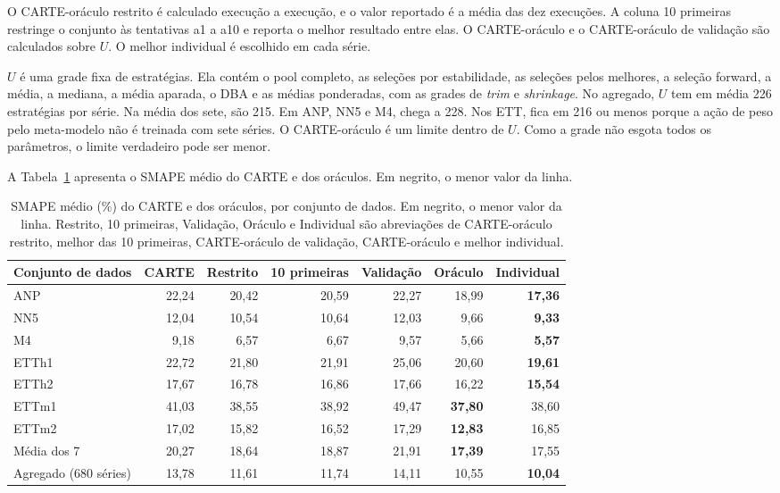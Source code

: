 O CARTE-oráculo restrito é calculado execução a execução, e o valor reportado é a média das dez execuções. A coluna 10 primeiras restringe o conjunto às tentativas a1 a a10 e reporta o melhor resultado entre elas. O CARTE-oráculo e o CARTE-oráculo de validação são calculados sobre $U$. O melhor individual é escolhido em cada série.

$U$ é uma grade fixa de estratégias. Ela contém o pool completo, as seleções por estabilidade, as seleções pelos melhores, a seleção forward, a média, a mediana, a média aparada, o DBA e as médias ponderadas, com as grades de \textit{trim} e \textit{shrinkage}. No agregado, $U$ tem em média 226 estratégias por série. Na média dos sete, são 215. Em ANP, NN5 e M4, chega a 228. Nos ETT, fica em 216 ou menos porque a ação de peso pelo meta-modelo não é treinada com sete séries. O CARTE-oráculo é um limite dentro de $U$. Como a grade não esgota todos os parâmetros, o limite verdadeiro pode ser menor.

A Tabela~\ref{tab:ablacao-carte-oraculo-smape} apresenta o SMAPE médio do CARTE e dos oráculos. Em negrito, o menor valor da linha.

\begin{table}[H]
\centering
\footnotesize
\setlength{\tabcolsep}{3pt}
\caption[SMAPE do CARTE e dos oráculos.]{SMAPE médio (\%) do CARTE e dos oráculos, por conjunto de dados. Em negrito, o menor valor da linha. Restrito, 10 primeiras, Validação, Oráculo e Individual são abreviações de CARTE-oráculo restrito, melhor das 10 primeiras, CARTE-oráculo de validação, CARTE-oráculo e melhor individual.}
\label{tab:ablacao-carte-oraculo-smape}
\begin{tabular}{@{}lrrrrrr@{}}
\toprule
\textbf{Conjunto de dados} & \textbf{CARTE} & \textbf{Restrito} & \textbf{10 primeiras} & \textbf{Validação} & \textbf{Oráculo} & \textbf{Individual} \\
\midrule
ANP    & 22,24 & 20,42 & 20,59 & 22,27 & 18,99 & \textbf{17,36} \\
NN5    & 12,04 & 10,54 & 10,64 & 12,03 & 9,66 & \textbf{9,33} \\
M4     & 9,18 & 6,57 & 6,67 & 9,57 & 5,66 & \textbf{5,57} \\
ETTh1  & 22,72 & 21,80 & 21,91 & 25,06 & 20,60 & \textbf{19,61} \\
ETTh2  & 17,67 & 16,78 & 16,86 & 17,66 & 16,22 & \textbf{15,54} \\
ETTm1  & 41,03 & 38,55 & 38,92 & 49,47 & \textbf{37,80} & 38,60 \\
ETTm2  & 17,02 & 15,82 & 16,52 & 17,29 & \textbf{12,83} & 16,85 \\
\midrule
Média dos 7 & 20,27 & 18,64 & 18,87 & 21,91 & \textbf{17,39} & 17,55 \\
Agregado (680 séries) & 13,78 & 11,61 & 11,74 & 14,11 & 10,55 & \textbf{10,04} \\
\bottomrule
\end{tabular}
\end{table}

